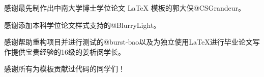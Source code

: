 %
%
%
%
%

\begin{acknowledgements} 

感谢最先制作出中南大学博士学位论文 LaTeX 模板的郭大侠@CSGrandeur。

感谢添加本科学位论文样式支持的@BlurryLight。

感谢帮助重构项目并进行测试的@burst-bao以及为独立使用LaTeX进行毕业论文写作提供宝贵经验的16级的姜析阅学长。

感谢所有为模板贡献过代码的同学们！

\end{acknowledgements}
